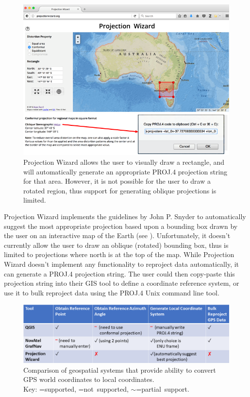 \begin{figure}[htbp]
\centering
\includegraphics[width=0.8\linewidth]{figs/spatial/proj-wizard.png}
\caption{Projection Wizard \cite{savric_projection_2016} allows the user to visually draw a rectangle, and will automatically generate an appropriate PROJ.4 projection string for that area. However, it is not possible for the user to draw a rotated region, thus support for generating oblique projections is limited.
\label{fig:proj-wizard}}
\end{figure}

Projection Wizard \cite{savric_projection_2016} implements the
guidelines by John P. Snyder \cite{snyder_map_1987} to automatically
suggest the most appropriate projection based upon a bounding box drawn
by the user on an interactive map of the Earth (see ). Unfortunately, it doesn't
currently allow the user to draw an oblique (rotated) bounding box, thus
is limited to projections where north is at the top of the map. While
Projection Wizard doesn't implement any functionality to reproject data
automatically, it can generate a PROJ.4 projection string. The user
could then copy-paste this projection string into their GIS tool to
define a coordinate reference system, or use it to bulk reproject data
using the PROJ.4 Unix command line tool.


\begin{figure}[htbp]
\centering
\includegraphics[width=\linewidth]{figs/spatial/tool-comparison-table.png}
\caption{Comparison of geospatial systems that provide ability to convert GPS world coordinates to local coordinates.\\Key: \cmark=supported, \xmark=not~supported, $\sim$=partial~support.%
\label{fig:tool-comparison-table}}
\end{figure}

